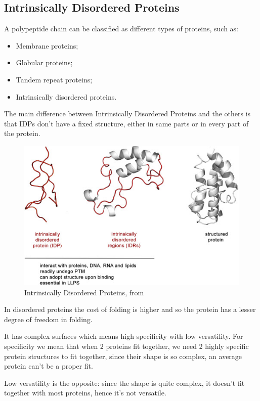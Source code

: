 \subsection{Intrinsically Disordered Proteins}
A polypeptide chain can be classified as different types of proteins, such as:
\begin{itemize}
	\item Membrane proteins;
	\item Globular proteins;
	\item Tandem repeat proteins;
	\item Intrinsically disordered proteins.
\end{itemize}

The main difference between Intrinsically Disordered Proteins and the others is that IDPs don't have a fixed structure, either in same parts or in every part of the protein.

\begin{figure}[h!]
	\includegraphics[scale=0.8]{res/proteins_overview/disordered.png}
	\centering
	\caption{Intrinsically Disordered Proteins, from \cite{intrinsic}}
	\label{fig:intrinsic}
\end{figure}
In disordered proteins the cost of folding is higher and so the protein has a lesser degree of freedom in folding.

It has complex surfaces which means high specificity with low versatility. For specificity we mean that when 2 proteins fit together, we need 2 highly specific protein structures to fit together, since their shape is so complex, an average protein can't be a proper fit.

Low versatility is the opposite: since the shape is quite complex, it doesn't fit together with most proteins, hence it's not versatile.


